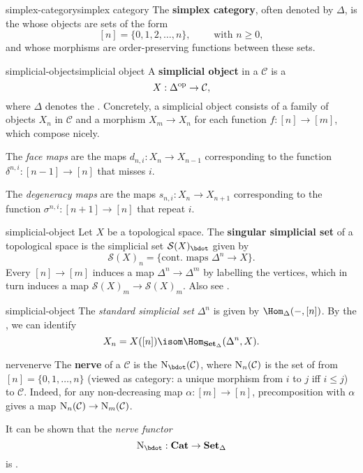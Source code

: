 \begin{topic}{simplex-category}{simplex category}
    The \textbf{simplex category}, often denoted by $\Delta$, is the  whose objects are sets of the form
    \[ [n] = \{ 0, 1, 2, \ldots, n \}, \qquad \text{ with } n \ge 0 , \]
    and whose morphisms are order-preserving functions between these sets.
\end{topic}

\begin{topic}{simplicial-object}{simplicial object}
    A \textbf{simplicial object} in a  $\mathcal{C}$ is a 
    \[ X : \Delta^\textup{op} \to \mathcal{C} , \]
    where $\Delta$ denotes the . Concretely, a simplicial object consists of a family of objects $X_n$ in $\mathcal{C}$ and a morphism $X_m \to X_n$ for each function $f : [n] \to [m]$, which compose nicely.
    
    The \textit{face maps} are the maps $d_{n, i} : X_n \to X_{n - 1}$ corresponding to the function $\delta^{n, i} : [n - 1] \to [n]$ that misses $i$.
    
    The \textit{degeneracy maps} are the maps $s_{n, i} : X_n \to X_{n + 1}$ corresponding to the function $\sigma^{n, i} : [n + 1] \to [n]$ that repeat $i$.
\end{topic}

\begin{example}{simplicial-object}
    Let $X$ be a topological space. The \textbf{singular simplicial set} of a topological space is the simplicial set $\mathcal{S}(X)_\bdot$ given by
    \[ \mathcal{S}(X)_n = \{ \text{cont. maps } \Delta^n \to X \} . \]
    Every $[n] \to [m]$ induces a map $\Delta^n \to \Delta^m$ by labelling the vertices, which in turn induces a map $\mathcal{S}(X)_m \to \mathcal{S}(X)_m$. Also see .
\end{example}

\begin{example}{simplicial-object}
    The \textit{standard simplicial set} $\Delta^n$ is given by $\Hom_\Delta(-, [n])$. By the , we can identify
    \[ X_n = X([n]) \isom \Hom_{\textbf{Set}_\Delta}(\Delta^n, X) . \]
\end{example}

\begin{topic}{nerve}{nerve}
    The \textbf{nerve} of a  $\mathcal{C}$ is the  $\textup{N}_\bdot(\mathcal{C})$, where $\textup{N}_n(\mathcal{C})$ is the set of  from $[n] = \{ 0, 1, \ldots, n \}$ (viewed as category: a unique morphism from $i$ to $j$ iff $i \le j$) to $\mathcal{C}$.
    Indeed, for any non-decreasing map $\alpha : [m] \to [n]$, precomposition with $\alpha$ gives a map $\textup{N}_n(\mathcal{C}) \to \textup{N}_m(\mathcal{C})$.
    
    It can be shown that the \textit{nerve functor}
    \[ \textup{N}_\bdot : \textbf{Cat} \to \textbf{Set}_\Delta \]
    is  .
\end{topic}

